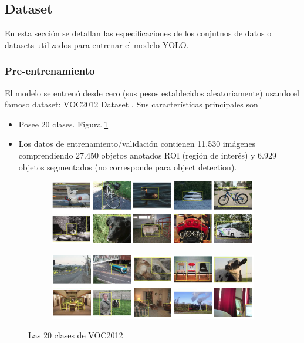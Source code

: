 \label{Dataset}
\subsection{Dataset}
En esta sección se detallan las especificaciones de los conjutnos de datos o datasets utilizados para entrenar el modelo YOLO.

\subsubsection{Pre-entrenamiento}
El modelo se entrenó desde cero (sus pesos establecidos aleatoriamente) usando el famoso dataset: VOC2012 Dataset \cite{voc2012}. Sus características principales son

\begin{itemize}
    \item Posee 20 clases. Figura \ref{fig:pascal-voc}
    \item Los datos de entrenamiento/validación contienen 11.530 imágenes comprendiendo 27.450 objetos anotados ROI (región de interés) y 6.929 objetos segmentados (no corresponde para object detection).
\end{itemize}

\begin{figure}[h!]
    \centering
    \begin{subfigure}[h]{\textwidth}
        \centering
        \includegraphics[width=\linewidth]{img/pascal-voc-20-classes-part1.png}
    \end{subfigure}
    \begin{subfigure}[h]{\textwidth}
        \centering
        \includegraphics[width=\linewidth]{img/pascal-voc-20-classes-part2.png}
    \end{subfigure}
    \caption{Las 20 clases de VOC2012}
    \label{fig:pascal-voc}
\end{figure}

